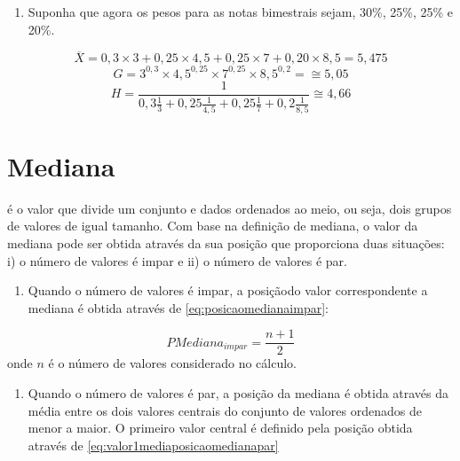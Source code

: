 \documentclass[
]{book}
\providecommand{\tightlist}{%
  \setlength{\itemsep}{0pt}\setlength{\parskip}{0pt}}
\begin{document}
\begin{enumerate}
\def\labelenumi{\roman{enumi})}
\setcounter{enumi}{1}
\tightlist
\item
  Suponha que agora os pesos para as notas bimestrais sejam, 30\%, 25\%, 25\% e 20\%.
\end{enumerate}

\begin{equation*}
    \overline{X} = 0,3\times 3 + 0,25\times 4,5 + 0,25\times 7 + 0,20 \times 8,5 = 5,475
  \end{equation*}
\begin{equation*}
    G = 3^{0,3} \times 4,5^{0,25} \times 7^{0,25} \times 8,5^{0,2} = \cong 5,05
  \end{equation*}
\begin{equation*}
    H = \frac{1}{0,3\frac{1}{3} +0,25\frac{1}{4,5} +0,25\frac{1}{7} +0,2\frac{1}{8,5}}   \cong 4,66
  \end{equation*}

\hypertarget{mediana}{%
\section{Mediana}\label{mediana}}

é o valor que divide um conjunto e dados ordenados ao meio, ou seja, dois
grupos de valores de igual tamanho. Com base na definição de mediana, o valor da mediana pode ser obtida através da sua posição que proporciona duas situações: i) o número de valores é impar e ii) o número de valores é par.

\begin{enumerate}
\def\labelenumi{\roman{enumi})}
\tightlist
\item
  Quando o número de valores é impar, a posiçãodo valor correspondente a mediana é obtida através de \eqref{eq:posicaomedianaimpar}:
\end{enumerate}

\begin{equation}
  PMediana_{impar} = \dfrac{n + 1}{2}
  \label{eq:posicaomedianaimpar}
\end{equation}
onde \(n\) é o número de valores considerado no cálculo.

\begin{enumerate}
\def\labelenumi{\roman{enumi})}
\setcounter{enumi}{1}
\tightlist
\item
  Quando o número de valores é par, a posição da mediana é obtida através da média entre os dois valores centrais do conjunto de valores ordenados de menor a maior. O primeiro valor central é definido pela posição obtida através de \eqref{eq:valor1mediaposicaomedianapar}
\end{enumerate}
\end{document}
